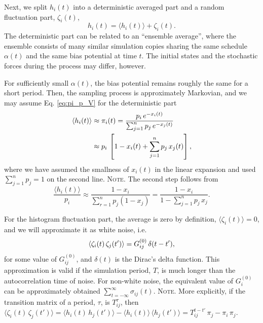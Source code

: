 \documentclass[reprint, superscriptaddress, floatfix]{revtex4-1}
\newcommand{\note}[1]{{\color{DarkGreen}\footnotesize \textsc{Note.} #1}}
\begin{document}
Next, we split $h_i(t)$ into a deterministic averaged part
and a random fluctuation part, $\zeta_i(t)$,
%
\begin{equation}
  h_i(t) = \langle h_i(t) \rangle + \zeta_i(t).
  \label{eq:h_split}
\end{equation}
%
The deterministic part can be related
to an ``ensemble average'',
where the ensemble consists of many similar simulation copies
sharing the same schedule $\alpha(t)$
and the same bias potential at time $t$.
%
The initial states and the stochastic forces
during the process may differ, however.



For sufficiently small $\alpha(t)$,
the bias potential remains roughly the same for a short period.
%
Then,
the sampling process is approximately Markovian, %
and we may assume Eq. \eqref{eq:pi_p_V}
for the deterministic part
%
\begin{align}
  \langle h_i(t) \rangle
  &\approx
  \pi_i(t)
  =
  \frac{                p_i \, e^{-x_i(t)} }
       { \sum_{j = 1}^n p_j \, e^{-x_j(t)} }
  \notag
  \\
  &\approx
  p_i \,
  \left[
    1 - x_i(t) + \sum_{j = 1}^n p_j \, x_j(t)
  \right]
  ,
  \label{eq:h_ave}
\end{align}
%
where we have assumed the smallness
of $x_i(t)$ in the linear expansion
and used $\sum_{j=1}^n p_j = 1$
on the second line.
%
\note{
The second step follows from
$$
\frac{ \langle h_i(t) \rangle }
     { p_i }
\approx
\frac{                       1 - x_i  }
     { \sum_{ r = 1 }^n p_j (1 - x_j) }
=
\frac{                       1 - x_i  }
     { 1 - \sum_{ j = 1 }^n p_j \, x_j }
.
$$
}%

%
For the histogram fluctuation part,
the average is zero by definition,
$\langle \zeta_i(t) \rangle = 0$,
%
and we will approximate it as white noise, i.e.
%
\begin{equation}
  \left\langle
    \zeta_i(t) \, \zeta_j(t')
  \right\rangle
  =
  G^{(0)}_{ij} \, \delta(t - t')
  ,
  \notag
\end{equation}
%
for some value of $G^{(0)}_{ij}$,
and $\delta(t)$ is the Dirac's delta function.
%
This approximation is valid if the simulation period, $T$,
is much longer than the autocorrelation time of noise.
%
For non-white noise,
the equivalent value of $G^{(0)}_i$ can be approximately obtained
$\sum_{t = -\infty}^\infty \sigma_{ij}(t)$.
%
\note{More explicitly,
if the transition matrix of a period, $\tau$,
is $T^\tau_{ij}$,
then
$
  \langle \zeta_i(t) \, \zeta_j(t') \rangle
  =
  \langle h_i(t) \, h_j(t') \rangle
  -
  \langle h_i(t) \rangle \, \langle h_j(t') \rangle
  =
  T^{t - t'}_{ij} \, \pi_j - \pi_i \, \pi_j.
$
}%
\end{document}
